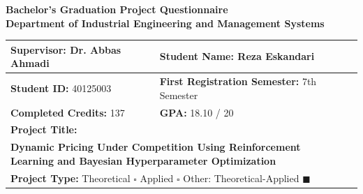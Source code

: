 \documentclass[11pt,a4paper]{article}
\begin{document}
\begin{center}
    {\large \textbf{Bachelor's Graduation Project Questionnaire}}\\[3pt]
    {\large \textbf{Department of Industrial Engineering and Management Systems}}
\end{center}

\vspace{0.4cm}

\noindent
\begin{tabularx}{\textwidth}{|l>{\raggedright\arraybackslash}X|l>{\raggedright\arraybackslash}X|}
\hline
\textbf{Supervisor:} Dr. Abbas Ahmadi & \textbf{Student Name:} Reza Eskandari \\ \hline
\textbf{Student ID:} 40125003 & \textbf{First Registration Semester:} 7th Semester \\ \hline
\textbf{Completed Credits:} 137 & \textbf{GPA:} 18.10 / 20 \\ \hline
\multicolumn{2}{|l|}{\textbf{Project Title:}} \\
\multicolumn{2}{|p{0.96\textwidth}|}{\textbf{Dynamic Pricing Under Competition Using Reinforcement Learning and Bayesian Hyperparameter Optimization}} \\ \hline
\multicolumn{2}{|p{0.96\textwidth}|}{\textbf{Project Type:} \quad Theoretical $\square$ \quad Applied $\square$ \quad Other: Theoretical-Applied $\blacksquare$} \\ \hline
\end{tabularx}

\vspace{-1pt}
\end{document}
